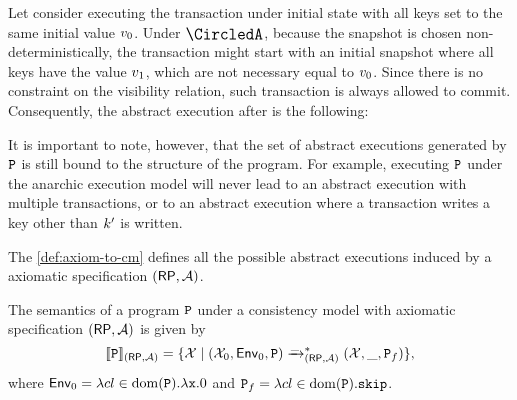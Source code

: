 
Let consider executing the transaction under initial state with all keys set to the same initial value \( v_0 \).
Under $\anarchicCM$, because the snapshot is chosen non-deterministically, 
the transaction might start with an initial snapshot where all keys have the value \( v_1 \),
which are not necessary equal to \( v_0 \).
Since there is no constraint on the visibility relation,
such transaction is always allowed to commit.
Consequently, the abstract execution after is the following: 
\begin{center}
\end{center}

It is important to note, however, that the set of abstract executions generated by $\texttt{P}$ 
is still bound to the structure of the program.
For example, executing $\texttt{P}$ under the anarchic execution model will never lead to 
an abstract execution with multiple transactions, 
or to an abstract execution where a transaction writes a key other than $k'$ is written.

The \cref{def:axiom-to-cm} defines all the possible abstract executions 
induced by a axiomatic specification $(\mathsf{RP}, \mathcal{A})$.

\begin{definition}
\label{def:axiom-to-cm}
The semantics of a program $\texttt{P}$ under a consistency model with axiomatic specification 
$(\mathsf{RP}, \mathcal{A})$ is given by 
\[
\llbracket \texttt{P} \rrbracket_{(\mathsf{RP}, \mathcal{A})} = \{ \mathcal{X} \mid (\mathcal{X}_{0}, \mathsf{Env}_{0}, \texttt{P}) \xrightarrow{\_}_{(\mathsf{RP}, \mathcal{A})}^{\ast} (\mathcal{X}, \_, \texttt{P}_{f}) \}, 
\]
where $\mathsf{Env}_{0} = \lambda {\ensuremath{cl}} \in \operatorname{dom}(\texttt{P}).\lambda \texttt{x}.0$ and $\texttt{P}_{f} = \lambda {\ensuremath{cl}} \in \operatorname{dom}(\texttt{P}).\texttt{skip}$.
\end{definition}

